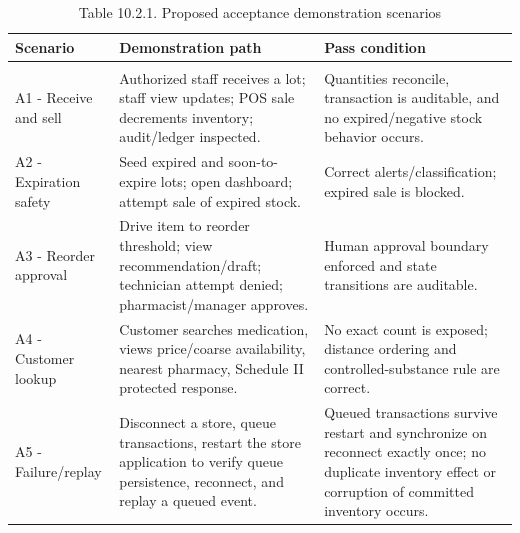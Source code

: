 {\def\LTcaptype{none} %
\begin{longtable}[]{|
  >{\raggedright\arraybackslash}m{}|
  >{\raggedright\arraybackslash}m{}|
  >{\raggedright\arraybackslash}m{}|}
\hline
\begin{minipage}[c]{\linewidth}\raggedright
\textbf{Scenario}
\end{minipage} & \begin{minipage}[c]{\linewidth}\raggedright
\textbf{Demonstration path}
\end{minipage} & \begin{minipage}[c]{\linewidth}\raggedright
\textbf{Pass condition}
\end{minipage} \\
\hline
\endhead

\caption*{Table 10.2.1. Proposed acceptance demonstration scenarios}\\
\endlastfoot
A1 - Receive and sell & Authorized staff receives a lot; staff view updates; POS sale decrements inventory; audit/ledger inspected. & Quantities reconcile, transaction is auditable, and no expired/negative stock behavior occurs. \\ \hline
A2 - Expiration safety & Seed expired and soon-to-expire lots; open dashboard; attempt sale of expired stock. & Correct alerts/classification; expired sale is blocked. \\ \hline
A3 - Reorder approval & Drive item to reorder threshold; view recommendation/draft; technician attempt denied; pharmacist/manager approves. & Human approval boundary enforced and state transitions are auditable. \\ \hline
A4 - Customer lookup & Customer searches medication, views price/coarse availability, nearest pharmacy, Schedule II protected response. & No exact count is exposed; distance ordering and controlled-substance rule are correct. \\ \hline
A5 - Failure/replay & Disconnect a store, queue transactions, restart the store application to verify queue persistence, reconnect, and replay a queued event. & Queued transactions survive restart and synchronize on reconnect exactly once; no duplicate inventory effect or corruption of committed inventory occurs. \\ \hline
\end{longtable}
}

